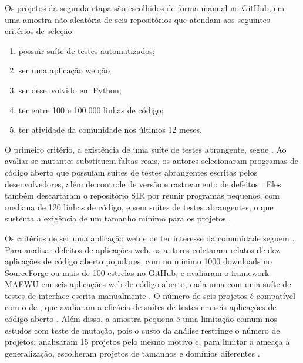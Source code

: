 
Os projetos da segunda etapa são escolhidos de forma manual no GitHub, em uma amostra não aleatória de seis repositórios que atendam aos seguintes critérios de seleção:

\begin{enumerate}[noitemsep, topsep=0pt]
    \item possuir suíte de testes automatizados;
    \item ser uma aplicação web;ão
    \item ser desenvolvido em Python;
    \item ter entre 100 e 100.000 linhas de código;
    \item ter atividade da comunidade nos últimos 12 meses.
\end{enumerate}

O primeiro critério, a existência de uma suíte de testes abrangente, segue . Ao avaliar se mutantes substituem faltas reais, os autores selecionaram programas de código aberto que possuíam suítes de testes abrangentes escritas pelos desenvolvedores, além de controle de versão e rastreamento de defeitos \cite{just2014}. Eles também descartaram o repositório SIR por reunir programas pequenos, com mediana de 120 linhas de código, e sem suítes de testes abrangentes, o que sustenta a exigência de um tamanho mínimo para os projetos \cite{just2014}.

Os critérios de ser uma aplicação web e de ter interesse da comunidade seguem . Para analisar defeitos de aplicações web, os autores coletaram relatos de dez aplicações de código aberto populares, com no mínimo 1000 downloads no SourceForge ou mais de 100 estrelas no GitHub, e avaliaram o framework MAEWU em seis aplicações web de código aberto, cada uma com uma suíte de testes de interface escrita manualmente \cite{yandrapally2021}. O número de seis projetos é compatível com o de , que avaliaram a eficácia de suítes de testes em seis aplicações de código aberto \cite{alenezi2016}. Além disso, a amostra pequena é uma limitação comum nos estudos com teste de mutação, pois o custo da análise restringe o número de projetos:  analisaram 15 projetos pelo mesmo motivo e, para limitar a ameaça à generalização, escolheram projetos de tamanhos e domínios diferentes \cite{ashong2025}.

